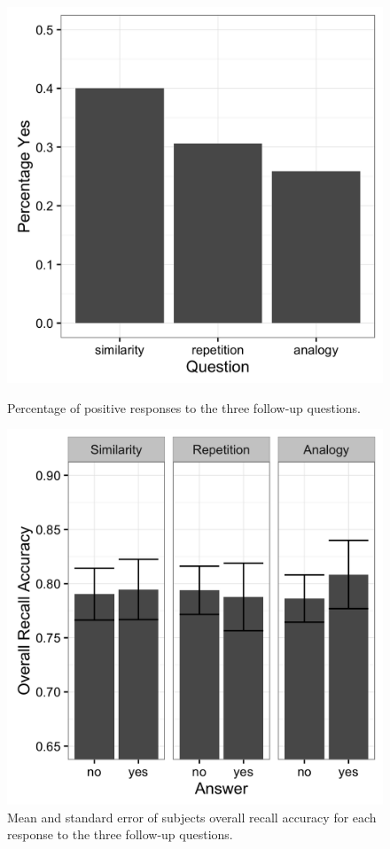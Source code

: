 \documentclass[a4paper,man,natbib,floatsintext,import]{apa6}
\begin{document}
\begin{figure}
\begin{minipage}[t]{.5\textwidth}
\includegraphics[width=.9\linewidth]{figures/fol_percYes.png}
\caption{Percentage of positive responses to the three follow-up questions.}
\label{fig:fol_percYes}
\end{minipage}
\begin{minipage}[t]{.5\textwidth}
\includegraphics[width=.9\linewidth]{figures/fol_answerXoverall.png}
\caption{Mean and standard error of subjects overall recall accuracy for each response to the three follow-up questions.}
\label{fig:fol_answerXoverall}
\end{minipage}
\end{figure}
\end{document}
